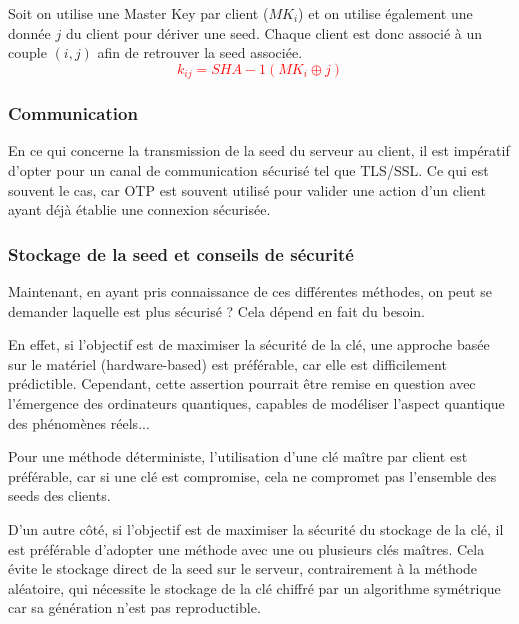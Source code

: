 \documentclass[a4paper, 10pt]{article}
\newcommand{\otp}{\textsc{OTP} }
\begin{document}
Soit on utilise \textcolor{myblue}{une Master Key par client} \textcolor{mygreen}{($MK_i$)} et on utilise également une donnée \textcolor{mygreen}{$j$} du client pour \textcolor{myblue}{dériver une seed}.
Chaque client est donc associé à un couple \textcolor{mygreen}{$(i,j)$} afin de retrouver la seed associée.
\textcolor{red}{$$
k_{ij} = SHA-1(MK_i \oplus j)
$$}

            \subsubsection{Communication}

En ce qui concerne la \textcolor{myblue}{transmission de la seed} du serveur au client, il est impératif d'opter pour un \textcolor{myblue}{canal de communication sécurisé} tel que \textcolor{mygreen}{TLS}/\textcolor{mygreen}{SSL}. 
Ce qui est souvent le cas, car \otp est souvent utilisé pour valider une action d'un client ayant déjà établie une connexion sécurisée.


            \subsubsection{Stockage de la seed et conseils de sécurité}

Maintenant, en ayant pris connaissance de ces différentes méthodes, on peut se demander laquelle est plus sécurisé ? Cela dépend en fait du besoin.

En effet, si l'objectif est de \textcolor{myblue}{maximiser la sécurité de la clé}, une approche basée sur le matériel (\textcolor{mygreen}{hardware-based}) est préférable, car elle est \textcolor{myblue}{difficilement prédictible}. Cependant, cette assertion pourrait être remise en question avec l'émergence des ordinateurs quantiques, capables de modéliser l'aspect quantique des phénomènes réels... 

Pour une \textcolor{myblue}{méthode déterministe}, l'utilisation d'\textcolor{mygreen}{une clé maître par client est préférable}, car si une clé est compromise, cela ne compromet pas l'ensemble des seeds des clients.

D'un autre côté, si l'objectif est de \textcolor{myblue}{maximiser la sécurité du stockage} de la clé, il est préférable d'adopter une \textcolor{myblue}{méthode avec une ou plusieurs clés maîtres}. Cela \textcolor{mygreen}{évite le stockage direct de la seed} sur le serveur, contrairement à la méthode aléatoire, qui nécessite le stockage de la clé chiffré par un algorithme symétrique car sa génération n'est pas reproductible.
\end{document}
